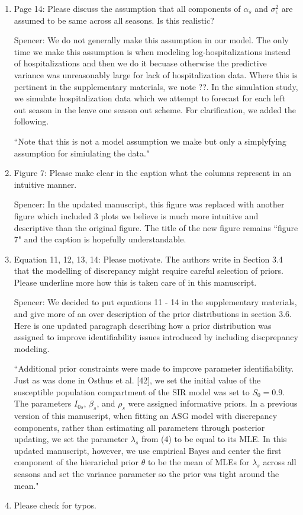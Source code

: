 \documentclass{article}
\newcommand{\spencer}[1]{{\color{blue} Spencer: #1}}
\begin{document}
\begin{enumerate}[-]
\item Page 14: Please discuss the assumption that all components of $\alpha_s$ and 
$\sigma_\epsilon^2$ are assumed to be same across all seasons. Is this realistic?

\spencer{We do not generally make this assumption in our model. The only time
we make this assumption is when modeling log-hospitalizations instead of 
hospitalizations and then we do it becuase otherwise the predictive variance
was unreasonably large for lack of hospitalization data.
Where this is pertinent in the supplementary materials, we note ??.
In the simulation study,
we simulate hospitalization data which we attempt to forecast for each left
out season in the leave one season out scheme. For clarification, we added 
the following.

``Note that this is not
a model assumption we make but only a simplyfying assumption for simiulating
the data."}

\item Figure 7: Please make clear in the caption what the columns represent in an 
intuitive manner. 

\spencer{In the updated manuscript, this figure was replaced with another figure
which included 3 plots we believe is much more intuitive and descriptive than
the original figure. The title of the new figure remains ``figure 7" and 
the caption is hopefully understandable.}

\item Equation 11, 12, 13, 14: Please motivate. The authors write in Section 3.4 
that the modelling of discrepancy might require careful selection of priors. 
Please underline more how this is taken care of in this manuscript.

\spencer{We decided to put equations 11 - 14 in the supplementary materials, and
give more of an over description of the prior distributions in section 3.6. Here
is one updated paragraph describing how a prior distribution was assigned to
improve identifiability issues introduced by including discprepancy modeling.

``Additional prior constraints were made to improve parameter identifiability. 
Just as was done in Osthus et al. [42],
we set the initial value of the 
susceptible population compartment of the SIR model was set to $S_0 = 0.9$. 
The parameters $I_{0s}$, $\beta_s$, and $\rho_s$ were assigned informative 
priors. In a previous version of this manuscript, when fitting an ASG model
with discrepancy components,
rather than estimating all parameters through posterior updating,
we set the parameter $\lambda_s$ from (4)
to be equal to its MLE. In this updated manuscript, 
however, we use empirical Bayes and center the first component of the 
hierarichal prior $\theta$ to be the mean of MLEs for $\lambda_s$ across
all seasons and set the variance parameter so the prior was tight around the
mean."}

\item Please check for typos.
  
\end{enumerate}
\end{document}
